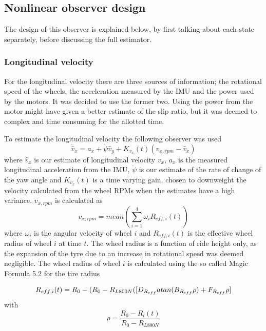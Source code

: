 \subsection{Nonlinear observer design}

The design of this observer is explained below, by first talking about each state separately, before discussing the full estimator.

\subsubsection{Longitudinal velocity}
For the longitudinal velocity there are three sources of information; the rotational speed of the wheels, the acceleration measured by the \gls{IMU} and the power used by the motors. It was decided to use the former two. Using the power from the motor might have given a better estimate of the slip ratio, but it was deemed to complex and time consuming for the allotted time. 

To estimate the longitudinal velocity the following observer was used
\begin{equation}
    \dot{\hat{v}}_x = a_x + \dot{\psi}\hat{v}_y + K_{v_x}(t)(v_{x,rpm} - \hat{v}_x)
\end{equation}
where $\hat{v}_x$ is our estimate of longitudinal velocity $v_x$, $a_x$ is the measured longitudinal acceleration from the IMU, $\dot{\psi}$ is our estimate of the rate of change of the yaw angle and $K_{v_x}(t)$ is a time varying gain, chosen to downweight the velocity calculated from the wheel \glspl{RPM} when the estimates have a high variance. $v_{x,rpm}$ is calculated as 
\begin{equation}
    v_{x,rpm} = mean(\sum_{i=1}^{4} \omega_{i}R_{eff,i}(t))
\end{equation}
where $\omega_i$ is the angular velocity of wheel $i$ and $R_{eff,i}(t)$ is the effective wheel radius of wheel $i$ at time $t$. The wheel radius is a function of ride height only, as the expansion of the tyre due to an increase in rotational speed was deemed negligible. The wheel radius of wheel $i$ is calculated using the so called Magic Formula 5.2 for the tire radius \cite{MagicFormula5_2}

\begin{equation}
    R_{eff,i}(t) = R_0 - (R_0-R_{L800N}([D_{R_{eff}}atan(B_{R_{eff}}\rho) + \\ F_{R_{eff}}\rho]
\end{equation}
with
\begin{equation}
    \rho = \frac{R_0-R_l(t)}{R_0-R_{L800N}}
\end{equation}

